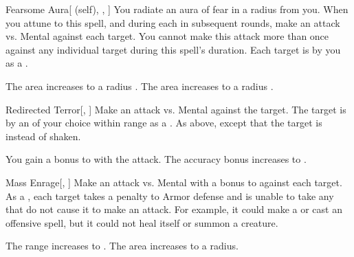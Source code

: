 \lowercase{\hypertarget{spell:Fearsome Aura}{}}\label{spell:Fearsome Aura}
\begin{attuneability}[Rank 3]{\hypertarget{spell:Fearsome Aura}{Fearsome Aura}}[ (self), , ]
You radiate an aura of fear in a \areamed radius  from you.
When you attune to this spell, and during each  in subsequent rounds, make an attack vs. Mental against each target.
You cannot make this attack more than once against any individual target during this spell's duration.
\hit Each target is  by you as a .

\rankline
{} The area increases to a \arealarge radius .
 The area increases to a \areahuge radius .
\end{attuneability}
\vspace{0.25em}



\lowercase{\hypertarget{spell:Redirected Terror}{}}\label{spell:Redirected Terror}
\begin{freeability}[Rank 3]{\hypertarget{spell:Redirected Terror}{Redirected Terror}}[, ]
Make an attack vs. Mental against the target.
\hit The target is \shaken by an  of your choice within range as a .
\crit As above, except that the target is \panicked instead of shaken.

\rankline
{} You gain a  bonus to  with the attack.
 The accuracy bonus increases to .
\end{freeability}
\vspace{0.25em}



\lowercase{\hypertarget{spell:Mass Enrage}{}}\label{spell:Mass Enrage}
\begin{freeability}[Rank 4]{\hypertarget{spell:Mass Enrage}{Mass Enrage}}[, ]
Make an attack vs. Mental with a  bonus to  against each target.
\hit As a , each target takes a  penalty to Armor defense and is unable to take any  that do not cause it to make an attack.
For example, it could make a  or cast an offensive spell, but it could not heal itself or summon a creature.

\rankline
{} The range increases to \rnglong.
 The area increases to a \arealarge radius.
\end{freeability}
\vspace{0.25em}



